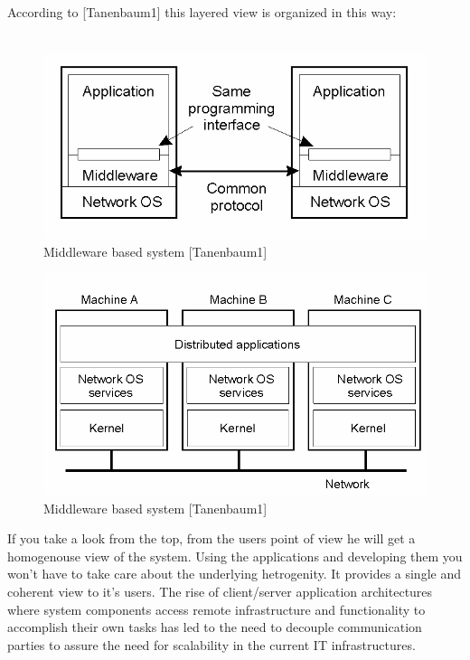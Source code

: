 \documentclass[a4paper,titlepage,11pt,DIV10,BCOR0.5cm,headinclude]{article}
\begin{document}
According to [Tanenbaum1] this layered view is organized in this way:
\\\\
\begin{figure}[!hbt]                               
	\centering                                           
	\includegraphics[width=1\textwidth]{pics/middlewareComm.jpg}
	\caption{Middleware based system [Tanenbaum1]}             
	\label{fig:MddlewareComm}
\end{figure}  
\begin{figure}[!hbt]                               
	\centering                                           
	\includegraphics[width=1\textwidth]{pics/middlewareGeneral.jpg}
	\caption{Middleware based system [Tanenbaum1]}             
	\label{fig:MiddlewareGeneral}
\end{figure}  
If you take a look from the top, from the users point of view he will get a homogenouse view of the system. Using the applications and developing them you won't have to take care about the underlying hetrogenity. It provides a single and coherent view to it's users. The rise of client/server application architectures where system components access remote infrastructure and functionality to accomplish their own tasks has led to the need to decouple communication parties to assure the need for scalability in the current IT infrastructures.
\end{document}
